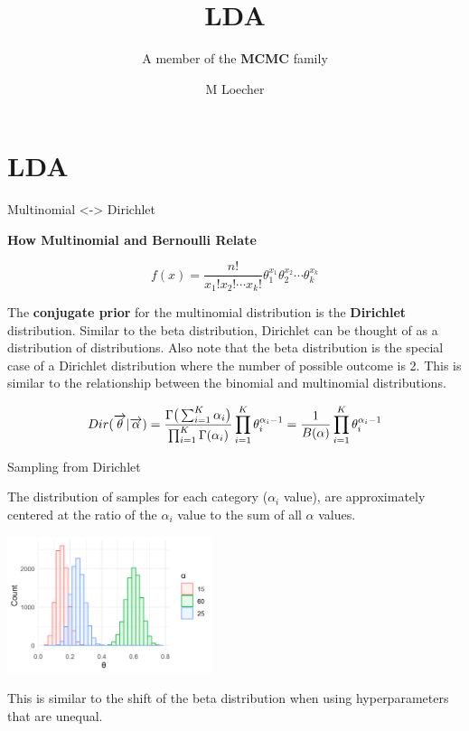 \documentclass[
  ignorenonframetext,
]{beamer}
\title{LDA}
\subtitle{A member of the \textbf{MCMC} family}
\author{M Loecher}
\date{}
\begin{document}
\frame{\titlepage}

\begin{frame}
  \tableofcontents[hideallsubsections]
\end{frame}
\hypertarget{lda}{%
\section{LDA}\label{lda}}

\begin{frame}{Multinomial \textless{}-\textgreater{} Dirichlet}
\protect\hypertarget{multinomial---dirichlet}{}

\textbf{How Multinomial and Bernoulli Relate}

\begin{equation}
f(x)=\dfrac{n!}{x_1!x_2!\cdots x_k!}\theta_1^{x_1} \theta_2^{x_2} \cdots \theta_k^{x_k}
\end{equation}

The \textbf{conjugate prior} for the multinomial distribution is the
\textbf{Dirichlet} distribution. Similar to the beta distribution,
Dirichlet can be thought of as a distribution of distributions. Also
note that the beta distribution is the special case of a Dirichlet
distribution where the number of possible outcome is 2. This is similar
to the relationship between the binomial and multinomial distributions.

\begin{equation}
Dir(\overrightarrow{\theta}|\overrightarrow{\alpha})=
{ 
  {\Gamma {\bigl (}\sum _{i=1}^{K}\alpha _{i}{\bigr )}}
  \over{\prod _{i=1}^{K}\Gamma (\alpha _{i})}
}
\prod _{i=1}^{K}\theta_{i}^{\alpha _{i}-1} =
{ 
  1 \over B(\alpha)
}
\prod _{i=1}^{K}\theta_{i}^{\alpha _{i}-1} 
\end{equation}

\end{frame}

\begin{frame}{Sampling from Dirichlet}
\protect\hypertarget{sampling-from-dirichlet}{}

\footnotesize

The distribution of samples for each category (\(\alpha_{i}\) value),
are approximately centered at the ratio of the \(\alpha_{i}\) value to
the sum of all \(\alpha\) values.

\begin{center}\includegraphics[width=6cm,height=4cm]{figures/DirchletSamples1} \end{center}

This is similar to the shift of the beta distribution when using
hyperparameters that are unequal.

\end{frame}
\end{document}
